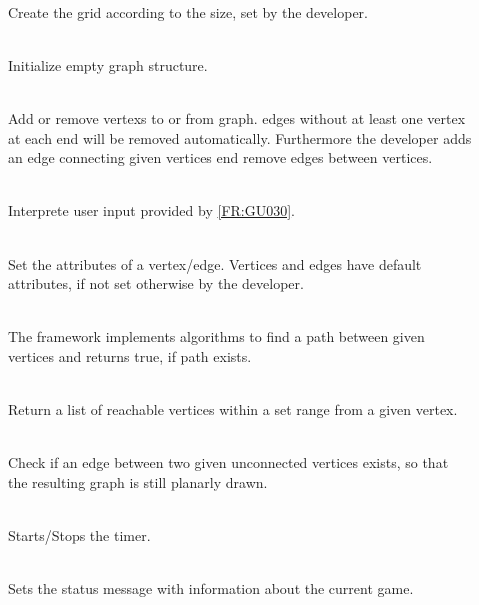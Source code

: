 \begin{description}
	\item[] \textbf{} \\
	Create the grid according to the size, set by the developer.
	\item[] \textbf{} \\
	Initialize empty graph structure.
	\item[] \textbf{} \\
	Add or remove \Glspl{vertex} to or from graph. \Glspl{edge} without at least one vertex at each end will be removed automatically. Furthermore the developer adds an edge connecting given vertices end remove edges between vertices.
	\item[] \textbf{} \\
	Interprete user input provided by \ref{FR:GU030}.
	\item[] \textbf{} \\
	Set the attributes of a vertex/edge. Vertices and edges have default attributes, if not set otherwise by the developer.
	\item[] \textbf{} \\
	The framework implements algorithms to find a \gls{path} between given vertices and returns true, if path exists.
	\item[] \textbf{} \\
	Return a list of reachable vertices within a set range from a given vertex.
	\item[] \textbf{} \\
	Check if an edge between two given unconnected vertices exists, so that the resulting graph is still planarly drawn.
	\item[] \textbf{} \\
	Starts/Stops the timer.
	\item[] \textbf{} \\
	Sets the status message with information about the current game.
\end{description}

